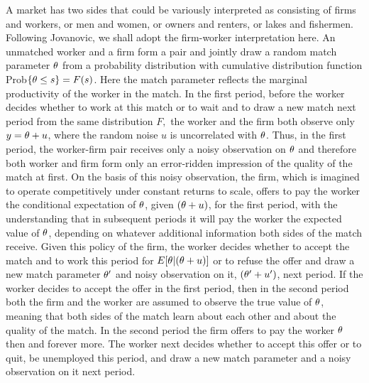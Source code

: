    A market has
two sides that could be variously interpreted as consisting of firms and
workers, or men and women, or owners and renters, or lakes and fishermen.
Following Jovanovic, we shall adopt the firm-worker interpretation here.  An
unmatched worker and a firm form a pair and jointly draw a random match
parameter ${\theta}$ from a probability distribution with cumulative distribution
function Prob$\{{\theta}\le s\}=F(s)$.  Here the match parameter reflects the
marginal productivity of the worker in the match.  In the first period, before
the worker decides whether to work at this match or to wait and
to draw a new match next period from the same distribution $F,$ the worker and
the firm both observe only $y={\theta}+u$, where the random noise $u$
  is
uncorrelated with ${\theta}$.  Thus, in the first period, the worker-firm pair
receives only a noisy observation on ${\theta}$ and therefore both worker and firm form only an error-ridden impression of the
quality of the match at first.  On the basis of this noisy observation, the
firm, which is imagined to operate competitively under constant returns to
scale, offers to pay the worker the conditional expectation of ${\theta}$, given
$({\theta}+u)$, for the first period, with the understanding that in subsequent
periods it will pay the worker the expected value of ${\theta}$, depending on
whatever additional information both sides of the match
receive.%
Given this
policy of the firm, the worker decides whether to accept the match  and to work
this period for $E[{\theta}|({\theta}+u)]$  or to refuse the offer and draw a new match
parameter ${\theta}'$ and noisy observation on it, $({\theta}'+u')$, next period.  If
the worker decides to accept the offer in the first period, then in the second
period both the firm and the worker are assumed to observe the true value of
${\theta}$, meaning that  both sides of the match learn about
each other and about the quality of the match.  In the second period the firm
offers to pay the worker ${\theta}$ then and forever more.  The worker next decides
whether to accept this offer or to quit, be unemployed this period, and
draw a new match parameter and a noisy observation on it next period.


